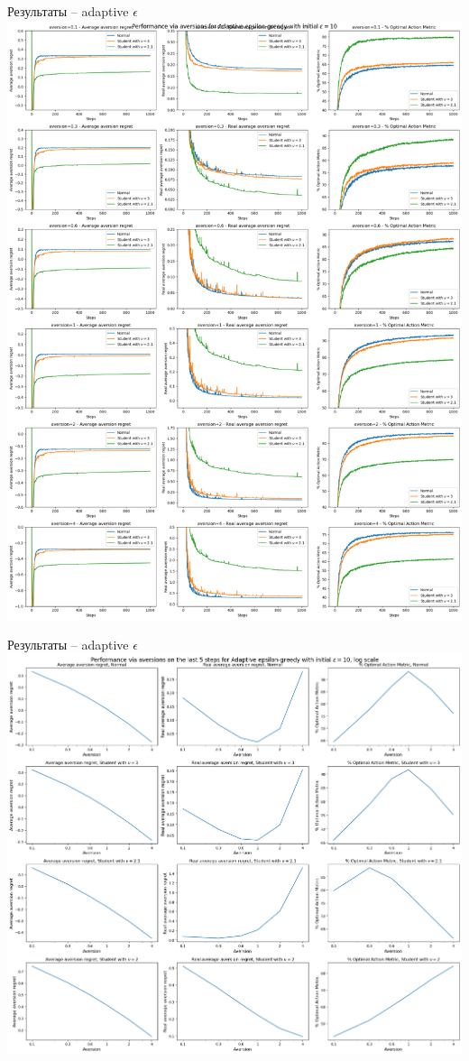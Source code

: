 \documentclass[11pt]{beamer} %
\begin{document}
    \begin{frame}{Результаты -- adaptive $\epsilon$}
        \includegraphics[scale=0.13,center]{images/theory_images/adaptive_epsilon/avers_avers.png}
    \end{frame}
    \begin{frame}{Результаты -- adaptive $\epsilon$}
        \includegraphics[scale=0.13,center]{images/theory_images/adaptive_epsilon/avers_last.png}
    \end{frame}
\end{document}
